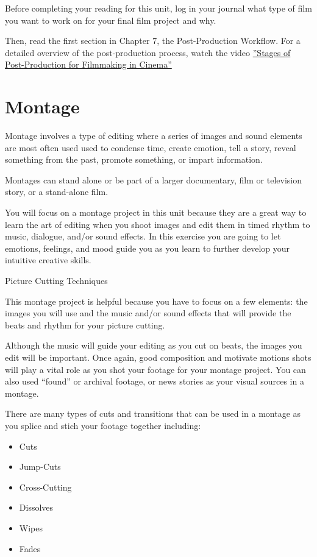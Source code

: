 \documentclass[
]{book}
\providecommand{\tightlist}{%
  \setlength{\itemsep}{0pt}\setlength{\parskip}{0pt}}
\begin{document}
\begin{reflect}
Before completing your reading for this unit, log in your journal what type of film you want to work on for your final film project and why.

Then, read the first section in Chapter 7, the Post-Production Workflow. For a detailed overview of the post-production process, watch the video \href{https://www.youtube.com/watch?v=IFjyVW21Vpw}{''Stages of Post-Production for Filmmaking in Cinema''}
\end{reflect}

\hypertarget{montage}{%
\section{Montage}\label{montage}}

Montage involves a type of editing where a series of images and sound elements are most often used used to condense time, create emotion, tell a story, reveal something from the past, promote something, or impart information.

Montages can stand alone or be part of a larger documentary, film or television story, or a stand-alone film.

You will focus on a montage project in this unit because they are a great way to learn the art of editing when you shoot images and edit them in timed rhythm to music, dialogue, and/or sound effects. In this exercise you are going to let emotions, feelings, and mood guide you as you learn to further develop your intuitive creative skills.

{Picture Cutting Techniques }

This montage project is helpful because you have to focus on a few elements: the images you will use and the music and/or sound effects that will provide the beats and rhythm for your picture cutting.

Although the music will guide your editing as you cut on beats, the images you edit will be important. Once again, good composition and motivate motions shots will play a vital role as you shot your footage for your montage project. You can also used ``found'' or archival footage, or news stories as your visual sources in a montage.

There are many types of cuts and transitions that can be used in a montage as you splice and stich your footage together including:

\begin{itemize}
\tightlist
\item
  Cuts
\item
  Jump-Cuts
\item
  Cross-Cutting
\item
  Dissolves
\item
  Wipes
\item
  Fades
\end{itemize}
\end{document}

